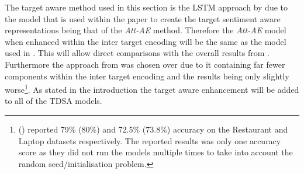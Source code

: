 The target aware method used in this section is the LSTM approach by \citet{hazarika-etal-2018-modeling} due to the model that is used within the paper to create the target sentiment aware representations being that of the \textit{Att-AE} method. Therefore the \textit{Att-AE} model when enhanced within the inter target encoding will be the same as the model used in \citet{hazarika-etal-2018-modeling}. This will allow direct comparisons with the overall results from \citet{hazarika-etal-2018-modeling}. Furthermore the approach from \citet{hazarika-etal-2018-modeling} was chosen over \citet{majumder-etal-2018-iarm} due to it containing far fewer components within the inter target encoding and the results being only slightly worse\footnote{\citet{hazarika-etal-2018-modeling} (\citet{majumder-etal-2018-iarm}) reported 79\% (80\%) and 72.5\% (73.8\%) accuracy on the Restaurant and Laptop datasets respectively. The reported results was only one accuracy score as they did not run the models multiple times to take into account the random seed/initialisation problem.}. As stated in the introduction the target aware enhancement will be added to all of the TDSA models.



